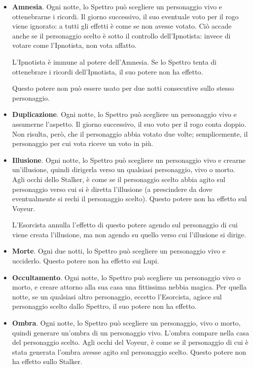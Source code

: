 \documentclass[a4paper,10pt]{article}
\begin{document}
\begin{itemize}
 \item {\bf Amnesia}. Ogni notte, lo Spettro può scegliere un personaggio vivo e ottenebrarne i ricordi. Il giorno successivo, il suo eventuale voto per il rogo viene ignorato: a tutti gli effetti è come se non avesse votato. Ciò accade anche se il personaggio scelto è sotto il controllo dell'Ipnotista: invece di votare come l'Ipnotista, non vota affatto.
 
 L'Ipnotista è immune al potere dell'Amnesia. Se lo Spettro tenta di ottenebrare i ricordi dell'Ipnotista, il suo potere non ha effetto.
 
 Questo potere non può essere usato per due notti consecutive sullo stesso personaggio.

 \item {\bf Duplicazione}. Ogni notte, lo Spettro può scegliere un personaggio vivo e assumerne l'aspetto. Il giorno successivo, il suo voto per il rogo conta doppio. Non risulta, però, che il personaggio abbia votato due volte; semplicemente, il personaggio per cui vota riceve un voto in più.

 \item {\bf Illusione}. Ogni notte, lo Spettro può scegliere un personaggio vivo e crearne un'illusione, quindi dirigerla verso un qualsiasi personaggio, vivo o morto.
 Agli occhi dello Stalker, è come se il personaggio scelto abbia agito sul personaggio verso cui si è diretta l'illusione (a prescindere da dove eventualmente si rechi il personaggio scelto).
 Questo potere non ha effetto sul Voyeur.
 
 L'Esorcista annulla l'effetto di questo potere agendo sul personaggio di cui viene creata l'illusione, ma non agendo su quello verso cui l'illusione si dirige. 
 
 \item {\bf Morte}. Ogni due notti, lo Spettro può scegliere un personaggio vivo e ucciderlo. Questo potere non ha effetto sui Lupi.
 
 \item {\bf Occultamento}. Ogni notte, lo Spettro può scegliere un personaggio vivo o morto, e creare attorno alla sua casa una fittissima nebbia magica. Per quella notte, se un qualsiasi altro personaggio, eccetto l'Esorcista, agisce sul personaggio scelto dallo Spettro, il suo potere non ha effetto.
 
 \item {\bf Ombra}. Ogni notte, lo Spettro può scegliere un personaggio, vivo o morto, quindi generare un'ombra di un personaggio vivo. L'ombra compare nella casa del personaggio scelto.
 Agli occhi del Voyeur, è come se il personaggio di cui è stata generata l'ombra avesse agito sul personaggio scelto.
 Questo potere non ha effetto sullo Stalker.
 

\end{itemize}
\end{document}
